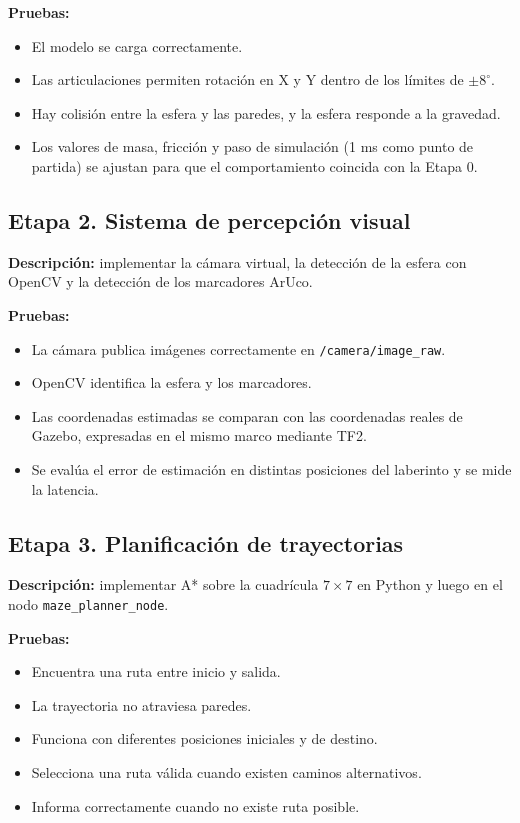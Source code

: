 \documentclass[11pt,a4paper]{article}
\begin{document}
\textbf{Pruebas:}
\begin{itemize}
    \item El modelo se carga correctamente.
    \item Las articulaciones permiten rotación en X y Y dentro de los límites de $\pm 8^\circ$.
    \item Hay colisión entre la esfera y las paredes, y la esfera responde a la gravedad.
    \item Los valores de masa, fricción y paso de simulación (1 ms como punto de partida) se ajustan para que el comportamiento coincida con la Etapa 0.
\end{itemize}

\subsection{Etapa 2. Sistema de percepción visual}
\textbf{Descripción:} implementar la cámara virtual, la detección de la esfera con OpenCV y la detección de los marcadores ArUco.

\textbf{Pruebas:}
\begin{itemize}
    \item La cámara publica imágenes correctamente en \texttt{/camera/image\_raw}.
    \item OpenCV identifica la esfera y los marcadores.
    \item Las coordenadas estimadas se comparan con las coordenadas reales de Gazebo, expresadas en el mismo marco mediante TF2.
    \item Se evalúa el error de estimación en distintas posiciones del laberinto y se mide la latencia.
\end{itemize}

\subsection{Etapa 3. Planificación de trayectorias}
\textbf{Descripción:} implementar A* sobre la cuadrícula $7 \times 7$ en Python y luego en el nodo \texttt{maze\_planner\_node}.

\textbf{Pruebas:}
\begin{itemize}
    \item Encuentra una ruta entre inicio y salida.
    \item La trayectoria no atraviesa paredes.
    \item Funciona con diferentes posiciones iniciales y de destino.
    \item Selecciona una ruta válida cuando existen caminos alternativos.
    \item Informa correctamente cuando no existe ruta posible.
\end{itemize}
\end{document}
